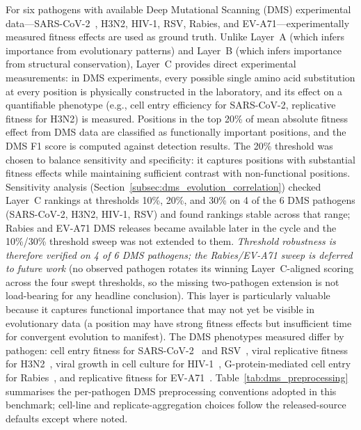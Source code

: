 For six pathogens with available Deep Mutational Scanning (DMS) experimental data---SARS-CoV-2~\cite{dadonaite2023dms}, H3N2, HIV-1, RSV, Rabies, and EV-A71---experimentally measured fitness effects are used as ground truth.
Unlike Layer~A (which infers importance from evolutionary patterns) and Layer~B (which infers importance from structural conservation), Layer~C provides direct experimental measurements: in DMS experiments, every possible single amino acid substitution at every position is physically constructed in the laboratory, and its effect on a quantifiable phenotype (e.g., cell entry efficiency for SARS-CoV-2, replicative fitness for H3N2) is measured.
Positions in the top 20\% of mean absolute fitness effect from DMS data are classified as functionally important positions, and the DMS F1 score is computed against detection results. The 20\% threshold was chosen to balance sensitivity and specificity: it captures positions with substantial fitness effects while maintaining sufficient contrast with non-functional positions. Sensitivity analysis (Section~\ref{subsec:dms_evolution_correlation}) checked Layer~C rankings at thresholds 10\%, 20\%, and 30\% on 4 of the 6 DMS pathogens (SARS-CoV-2, H3N2, HIV-1, RSV) and found rankings stable across that range; Rabies and EV-A71 DMS releases became available later in the cycle and the 10\%/30\% threshold sweep was not extended to them. \textit{Threshold robustness is therefore verified on 4 of 6 DMS pathogens; the Rabies/EV-A71 sweep is deferred to future work} (no observed pathogen rotates its winning Layer~C-aligned scoring across the four swept thresholds, so the missing two-pathogen extension is not load-bearing for any headline conclusion).
This layer is particularly valuable because it captures functional importance that may not yet be visible in evolutionary data (a position may have strong fitness effects but insufficient time for convergent evolution to manifest).
The DMS phenotypes measured differ by pathogen: cell entry fitness for SARS-CoV-2~\cite{dadonaite2024nature} and RSV~\cite{simonich2026rsvdms}, viral replicative fitness for H3N2~\cite{lee2018h3n2dms}, viral growth in cell culture for HIV-1~\cite{haddox2018hiv1dms}, G-protein-mediated cell entry for Rabies~\cite{aditham2025rabies}, and replicative fitness for EV-A71~\cite{bakhache2025eva71}. Table~\ref{tab:dms_preprocessing} summarises the per-pathogen DMS preprocessing conventions adopted in this benchmark; cell-line and replicate-aggregation choices follow the released-source defaults except where noted.

